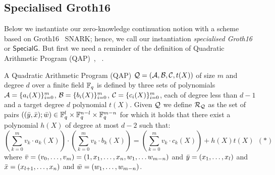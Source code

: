 \begin{definition}[ZK Continuations]
\end{definition} 


\subsection{Specialised Groth16}
\label{sec:rvrf_groth16}

Below we instantiate our zero-knowledge continuation notion with a scheme based on Groth16~\cite{Groth16} SNARK;
hence, we call our instantiation \emph{specialised Groth16} or \emph{$\mathsf{SpecialG}$}. But first we need a 
reminder of the definition of Quadratic Arithmetic Program (QAP)~\cite{LegoSNARK}, ~\cite{GGPR13}.

\begin{definition}[QAP] 
\label{def:QAP}
A Quadratic Arithmetic Program (QAP) $\mathcal{Q} = (\mathcal{A}, \mathcal{B}, \mathcal{C}, t(X))$ of size $m$ 
and degree $d$ over a finite field $\mathbb{F}_q$ is defined by three sets of polynomials $\mathcal{A} = \{a_i(X)\}_{i=0}^m$, 
$\mathcal{B} = \{b_i(X)\}_{i=0}^m$, $\mathcal{C} = \{c_i(X)\}_{i=0}^m$, each of degree less than $d-1$ and a target degree $d$ polynomial $t(X)$. Given 
$\mathcal{Q}$ we define $\mathcal{R}_{\mathcal{Q}}$ as the set of pairs $((\bar{y}, \bar{x}); \bar{w}) \in \mathbb{F}_q^{l} \times \mathbb{F}_q^{n-l} \times \mathbb{F}_q^{m-n}$ for which it 
holds that there exist a polynomial $h(X)$ of degree at most $d-2$ such that:
$$(\sum_{k=0}^m v_k \cdot a_k(X)) \cdot (\sum_{k=0}^m v_k \cdot b_k(X)) = (\sum_{k=0}^m v_k \cdot c_k(X)) + h(X)t(X) \ \ (\ast)$$ 
where $\bar{v} = (v_0, \ldots, v_m) = (1, x_1, \ldots, x_n, w_1, \ldots w_{m-n})$ and $\bar{y} = (x_1, \ldots, x_l)$ and 
$\bar{x} = (x_{l+1}, \ldots, x_n)$ and $\bar{w} = (w_1, \ldots, w_{m-n})$. 
\end{definition}

\noindent {}


